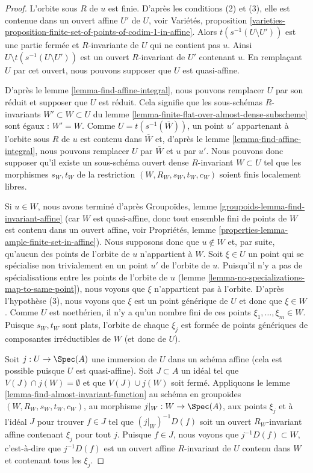 \begin{proof}
L'orbite sous $R$ de $u$ est finie. D'après les conditions (2) et (3), elle est contenue
dans un ouvert affine $U'$ de $U$, voir
Variétés, proposition
\ref{varieties-proposition-finite-set-of-points-of-codim-1-in-affine}.
Alors $t(s^{-1}(U \setminus U'))$ est une partie fermée et $R$-invariante
de $U$ qui ne contient pas $u$. Ainsi
$U \setminus t(s^{-1}(U \setminus U'))$ est un ouvert $R$-invariant
de $U'$ contenant $u$.
En remplaçant $U$ par cet ouvert, nous pouvons supposer que $U$ est quasi-affine.

\medskip\noindent
D'après le lemme \ref{lemma-find-affine-integral}, nous pouvons remplacer $U$ par son réduit
et supposer que $U$ est réduit. Cela signifie que les sous-schémas $R$-invariants
$W' \subset W \subset U$ du
lemme \ref{lemma-finite-flat-over-almost-dense-subscheme}
sont égaux : $W' = W$. Comme $U = t(s^{-1}(\overline{W}))$, un point
$u'$ appartenant à l'orbite sous $R$ de $u$ est contenu dans $\overline{W}$
et, d'après le lemme \ref{lemma-find-affine-integral},
nous pouvons remplacer $U$ par $\overline{W}$ et $u$ par $u'$.
Nous pouvons donc supposer qu'il existe
un sous-schéma ouvert dense $R$-invariant $W \subset U$ tel que
les morphismes $s_W, t_W$ de la restriction $(W, R_W, s_W, t_W, c_W)$ soient
finis localement libres.

\medskip\noindent
Si $u \in W$, nous avons terminé d'après
Groupoïdes, lemme \ref{groupoids-lemma-find-invariant-affine}
(car $W$ est quasi-affine, donc tout ensemble fini de points
de $W$ est contenu dans un ouvert affine, voir
Propriétés, lemme \ref{properties-lemma-ample-finite-set-in-affine}).
Nous supposons donc que $u \not \in W$ et, par suite, qu'aucun des points de
l'orbite de $u$ n'appartient à $W$. Soit $\xi \in U$
un point qui se spécialise non trivialement en un point $u'$ de l'orbite
de $u$. Puisqu'il n'y a pas de spécialisations entre les points de
l'orbite de $u$ (lemme \ref{lemma-no-specializations-map-to-same-point}),
nous voyons que $\xi$ n'appartient pas à l'orbite.
D'après l'hypothèse (3), nous voyons que $\xi$ est un point générique de $U$
et donc que $\xi \in W$.
Comme $U$ est noethérien, il n'y a qu'un nombre fini de ces
points $\xi_1, \ldots, \xi_m \in W$. Puisque $s_W, t_W$ sont plats, l'orbite
de chaque $\xi_j$ est formée de points génériques de composantes irréductibles
de $W$ (et donc de $U$).

\medskip\noindent
Soit $j : U \to \Spec(A)$ une immersion de $U$ dans un schéma affine
(cela est possible puisque $U$ est quasi-affine). Soit $J \subset A$
un idéal tel que $V(J) \cap j(W) = \emptyset$ et que $V(J) \cup j(W)$
soit fermé. Appliquons le lemme \ref{lemma-find-almost-invariant-function}
au schéma en groupoïdes $(W, R_W, s_W, t_W, c_W)$, au morphisme
$j|_W : W \to \Spec(A)$, aux points $\xi_j$ et à l'idéal $J$
pour trouver $f \in J$ tel que $(j|_W)^{-1}D(f)$ soit un ouvert $R_W$-invariant
affine contenant $\xi_j$ pour tout $j$. Puisque $f \in J$,
nous voyons que $j^{-1}D(f) \subset W$, c'est-à-dire que $j^{-1}D(f)$ est
un ouvert affine $R$-invariant de $U$ contenu dans $W$
et contenant tous les $\xi_j$.


\end{proof}
